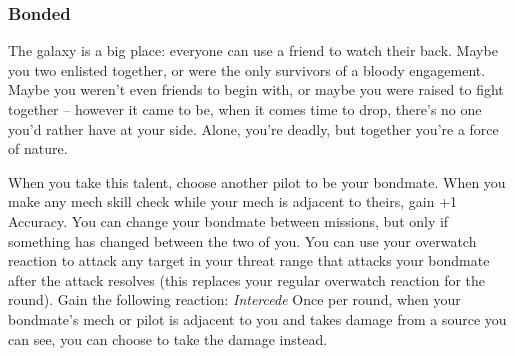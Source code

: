 \subsubsection{Bonded}



\begin{talent}
{The galaxy is a big place: everyone can use a friend to watch their back. Maybe you two enlisted together, or were the only survivors of a bloody engagement. Maybe you weren’t even friends to begin with, or maybe you were raised to fight together -- however it came to be, when it comes time to drop, there’s no one you’d rather have at your side. Alone, you’re deadly, but together you’re a force of nature.}

When you take this talent, choose another pilot to be your bondmate. When you make any mech skill check while your mech is adjacent to theirs, gain +1 Accuracy. You can change your bondmate between missions, but only if something has changed between the two of you.
You can use your overwatch reaction to attack any target in your threat range that attacks your bondmate after the attack resolves (this replaces your regular overwatch reaction for the round).
Gain the following reaction:
\textit{Intercede} 
\Reaction
Once per round, when your bondmate’s mech or pilot is adjacent to you and takes damage from a source you can see, you can choose to take the damage instead.
\end{talent}